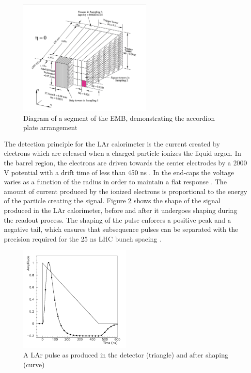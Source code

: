 \begin{figure}
        \centering
	\includegraphics[width=0.6\textwidth]{figures/ch4/lar_accordion.png}
	\caption{Diagram of a segment of the EMB, demonstrating the accordion plate arrangement \cite{lar_tdr}}
	\label{fig:lar_accordion}
\end{figure}

The detection principle for the LAr calorimeter is the current created by electrons which are released when a charged particle ionizes the liquid argon. In the barrel region, the electrons are driven towards the center electrodes by a 2000 V potential with a drift time of less than 450 ns \cite{lar_overview}. In the end-caps the voltage varies as a function of the radius in order to maintain a flat response \cite{lar_tdr}. The amount of current produced by the ionized electrons is proportional to the energy of the particle creating the signal. Figure \ref{fig:lar_pulse} shows the shape of the signal produced in the LAr calorimeter, before and after it undergoes shaping during the readout process. The shaping of the pulse enforces a positive peak and a negative tail, which ensures that subsequence pulses can be separated with the precision required for the 25 ns LHC bunch spacing \cite{lar_tdr}. \par

\begin{figure}
        \centering
	\includegraphics[width=0.5\textwidth]{figures/ch4/lar_pulse.png}
	\caption{A LAr pulse as produced in the detector (triangle) and after shaping (curve) \cite{lar_tdr}}
	\label{fig:lar_pulse}
\end{figure}

